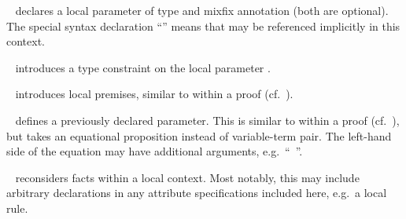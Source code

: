 \begin{isabellebody}
\begin{isamarkuptext}
\begin{description}
  \begin{description}

  \item \hyperlink{element.fixes}{\mbox{}}~ declares a local
  parameter of type \isa{{\isasymtau}} and mixfix annotation  (both
  are optional).  The special syntax declaration ``\isa{{\isachardoublequote}{\isacharparenleft}{\isasymSTRUCTURE}{\isacharparenright}{\isachardoublequote}}'' means that  may be referenced
  implicitly in this context.

  \item \hyperlink{element.constrains}{\mbox{}}~ introduces a type
  constraint \isa{{\isasymtau}} on the local parameter .

  \item \hyperlink{element.assumes}{\mbox{}}~
  introduces local premises, similar to \hyperlink{command.assume}{\mbox{}} within a
  proof (cf.\ ).

  \item \hyperlink{element.defines}{\mbox{}}~ defines a previously
  declared parameter.  This is similar to \hyperlink{command.def}{\mbox{}} within a
  proof (cf.\ ), but \hyperlink{element.defines}{\mbox{}}
  takes an equational proposition instead of variable-term pair.  The
  left-hand side of the equation may have additional arguments, e.g.\
  ``\hyperlink{element.defines}{\mbox{}}~''.

  \item \hyperlink{element.notes}{\mbox{}}~
  reconsiders facts within a local context.  Most notably, this may
  include arbitrary declarations in any attribute specifications
  included here, e.g.\ a local \hyperlink{attribute.simp}{\mbox{}} rule.


\end{description}
\end{description}
\end{isamarkuptext}
\end{isabellebody}
